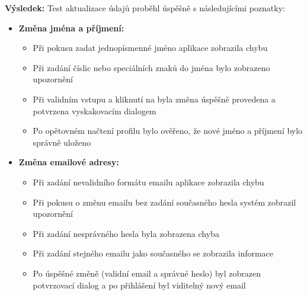 \documentclass[czech, bp, kiv, he, iso690numb, pdf]{fasthesis}
\begin{document}
    \noindent \textbf{Výsledek:}
    Test aktualizace údajů proběhl úspěšně s následujícími poznatky:

    \begin{itemize}
        \item \textbf{Změna jména a příjmení:}
        \begin{itemize}
            \item Při pokusu zadat jednopísmenné jméno aplikace zobrazila chybu 
            \item Při zadání číslic nebo speciálních znaků do jména bylo zobrazeno upozornění 
            \item Při validním vstupu a kliknutí na  byla změna úspěšně provedena a potvrzena vyskakovacím dialogem
            \item Po opětovném načtení profilu bylo ověřeno, že nové jméno a příjmení bylo správně uloženo
        \end{itemize}

        \item \textbf{Změna emailové adresy:}
        \begin{itemize}
            \item Při zadání nevalidního formátu emailu aplikace zobrazila chybu 
            \item Při pokusu o změnu emailu bez zadání současného hesla systém zobrazil upozornění 
            \item Při zadání nesprávného hesla byla zobrazena chyba 
            \item Při zadání stejného emailu jako současného se zobrazila informace 
            \item Po úspěšné změně (validní email a správné heslo) byl zobrazen potvrzovací dialog a po přihlášení byl viditelný nový email
        \end{itemize}


\end{itemize}
\end{document}
